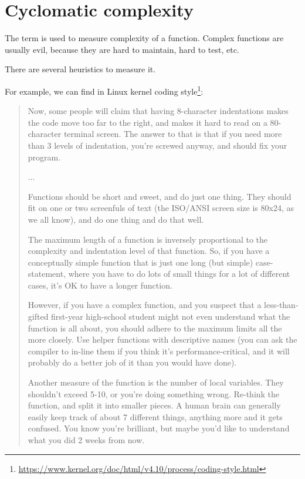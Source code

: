 \section{Cyclomatic complexity}

The term is used to measure complexity of a function.
Complex functions are usually evil, because they are hard to maintain, hard to test, etc.

There are several heuristics to measure it.

For example, we can find in 
Linux kernel coding style\footnote{\url{https://www.kernel.org/doc/html/v4.10/process/coding-style.html}}:

\begin{framed}
\begin{quotation}
Now, some people will claim that having 8-character indentations makes the code move too far to the right, and makes it hard to read on a 80-character terminal screen. The answer to that is that if you need more than 3 levels of indentation, you’re screwed anyway, and should fix your program.

...

Functions should be short and sweet, and do just one thing. They should fit on one or two screenfuls of text (the ISO/ANSI screen size is 80x24, as we all know), and do one thing and do that well.

The maximum length of a function is inversely proportional to the complexity and indentation level of that function. So, if you have a conceptually simple function that is just one long (but simple) case-statement, where you have to do lots of small things for a lot of different cases, it’s OK to have a longer function.

However, if you have a complex function, and you suspect that a less-than-gifted first-year high-school student might not even understand what the function is all about, you should adhere to the maximum limits all the more closely. Use helper functions with descriptive names (you can ask the compiler to in-line them if you think it’s performance-critical, and it will probably do a better job of it than you would have done).

Another measure of the function is the number of local variables. They shouldn’t exceed 5-10, or you’re doing something wrong. Re-think the function, and split it into smaller pieces. A human brain can generally easily keep track of about 7 different things, anything more and it gets confused. You know you’re brilliant, but maybe you’d like to understand what you did 2 weeks from now.
\end{quotation}
\end{framed}

